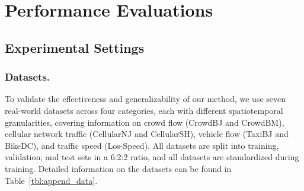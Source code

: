 \section{Performance Evaluations}




\subsection{Experimental Settings}


\subsubsection*{\textbf{Datasets.}}

To validate the effectiveness and generalizability of our method, we use seven real-world datasets across four categories, each with different spatiotemporal granularities, covering information on crowd flow (CrowdBJ and CrowdBM), cellular network traffic (CellularNJ and CellularSH), vehicle flow (TaxiBJ and BikeDC), and traffic speed (Los-Speed). All datasets are split into training, validation, and test sets in a 6:2:2 ratio, and all datasets are standardized during training. Detailed information on the datasets can be found in Table~\ref{tbl:append_data}.









